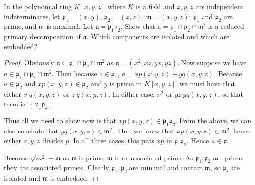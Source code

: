 \begin{exercise}
	In the polynomial ring $K[x,y,z]$ where $K$ is a field and $x, y,z$ are independent indeterminates, let $\mathfrak{p}_1 = (x,y)$, $\mathfrak{p}_2 = (x,z)$, $\mathfrak{m} = (x,y,z)$; $\mathfrak{p}_1$ and $\mathfrak{p}_2$ are prime, and $\mathfrak{m}$ is maximal. Let $\mathfrak{a} = \mathfrak{p}_1\mathfrak{p}_2$. Show that $\mathfrak{a} = \mathfrak{p}_1 \cap \mathfrak{p}_2 \cap \mathfrak{m}^2$ is a reduced primary decomposition of $\mathfrak{a}$. Which components are isolated and which are embedded? 
\end{exercise}
\begin{proof}
	Obviously $\mathfrak{a} \subseteq \mathfrak{p}_1 \cap \mathfrak{p}_2 \cap \mathfrak{m}^2 $ as $\mathfrak{a} = (x^2,xz,yx,yz) $.
	Now suppose we have $a \in \mathfrak{p}_1 \cap \mathfrak{p}_2 \cap \mathfrak{m}^2 $.
	Then because $a \in \mathfrak{p}_1 $, $a = xp(x,y,z)+yq(x,y,z) $.
	Because $a \in \mathfrak{p}_2 $ and $xp(x,y,z) \in \mathfrak{p}_2 $ and $y$ is prime in $K[x,y,z] $, we must have that either $x| q(x,y,z) $ or $z | q(x,y,z) $.
	In either case, $x^2 $ or $yz | yq(x,y,z) $, so that term is in $\mathfrak{p}_1 \mathfrak{p}_2$.

	Thus all we need to show now is that $xp(x,y,z) \in \mathfrak{p}_1 \mathfrak{p}_2 $.
	From the above, we can also conclude that $yq(x,y,z) \in \mathfrak{m}^2 $.
	Thus we know that $xp(x,y,z) \in \mathfrak{m}^2 $, hence either $x,y,z $ divides $p $.
	In all three cases, this puts $xp $ in $\mathfrak{p}_1 \mathfrak{p}_2 $.
	Hence $a \in \mathfrak{a} $.

	Because $\sqrt{m^2}  = \mathfrak{m} $ as $\mathfrak{m} $ is prime, $\mathfrak{m} $ is an associated prime.
	As $\mathfrak{p}_1, \mathfrak{p}_2 $ are prime, they are associated primes.
	Clearly $\mathfrak{p}_1,\mathfrak{p}_2 $ are minimal and contain $\mathfrak{m} $, so $\mathfrak{p}_i $ are isolated and $\mathfrak{m} $ is embedded.
\end{proof}

